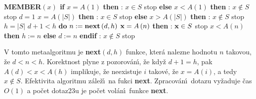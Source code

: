{\bf MEMBER$\left(x\right)$\newline 
if} $x=A\left(1\right)$ {\bf then}\newline 
\phantom{---}{\bf V\'ystup}: $x\in S$ stop\newline 
{\bf else}\newline 
\phantom{---}{\bf if} $x<A\left(1\right)$ {\bf then}\newline 
\phantom{------}{\bf V\'ystup}: $x\notin S$ stop\newline 
\phantom{---}{\bf else}\newline 
\phantom{------}$d=1$\newline 
\phantom{---}{\bf endif\newline
\bf endif\newline 
if} $x=A\left(|S|\right)$ {\bf then}\newline 
\phantom{---}{\bf V\'ystup}: $x\in S$ stop\newline 
{\bf else}\newline 
\phantom{---}{\bf if} $x>A\left(|S|\right)$ {\bf then}\newline 
\phantom{------}{\bf V\'ystup}: $x\notin S$ stop\newline 
\phantom{---}{\bf else}\newline 
\phantom{------}$h=|S|$\newline 
\phantom{---}{\bf endif\newline
endif\newline 
while} $d+1<h$ {\bf do}\newline 
\phantom{---}$n:=\text{{\bf next}}\left(d,h\right)$\newline 
\phantom{---}{\bf if} $\bold x=A\left(n\right)$ {\bf then}\newline 
\phantom{------}{\bf V\'ystup}: $\bold x\in S$ stop\newline 
\phantom{---}{\bf else}\newline 
\phantom{------}{\bf if} $x<A\left(n\right)$ {\bf then} $h:=n$ {\bf else} $d:=n$ {\bf endif}\newline 
\phantom{---}{\bf endif\newline 
enddo\newline 
V\'ystup}: $x\notin S$ stop
\medskip

\flushpar V tomto metaalgoritmu je {\bf next$\left(d,h\right)$} funkce, kter\'a 
nalezne hodnotu $n$ takovou, \v ze $d<n<h$. Korektnost plyne 
z pozorov\'an\'\i , \v ze kdy\v z $d+1=h$, pak $A\left(d\right)<x<A\left(h\right)$ 
implikuje, \v ze neexistuje $i$ takov\'e, \v ze $x=A\left(i\right)$, a tedy 
$x\notin S$. Efektivita algoritmu z\'ale\v z\'\i\ na fukci {\bf next}. 
Zpracov\'an\'\i\ dotazu vy\v zaduje \v cas $O\left(1\right)$ a po\v cet 
dotaz\accent23u je 
po\v cet vol\'an\'\i\ funkce {\bf next}. 
\medskip

